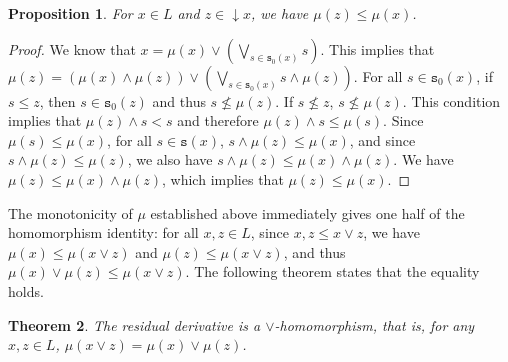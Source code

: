 \documentclass{article}
\newcommand{\comm}[2]{\begin{tcolorbox}[colback=gray!40]\textbf{Comment} (#1) : #2\end{tcolorbox}}
\newcommand{\blue}{\color{blue}}
\newtheorem{theorem}{Theorem}[section]
\newtheorem{proposition}[theorem]{Proposition}
\begin{document}
\begin{proposition}\label{proposition.increase.derivative}
    For $x \in L$ and $z \in \mathop{\downarrow}x$, we have $\mu(z) \le \mu(x)$. 
    \end{proposition}

\begin{proof}
     {We know that $x = \mu(x) \vee \left(\bigvee_{s \in \texttt{s}_0(x)} s\right)$.}
     This implies that 
    $\mu(z) = (\mu(x) \wedge \mu(z)) \vee \left(\bigvee_{s \in \texttt{s}_0(x)} s\wedge \mu(z)\right)$. For all $s \in \texttt{s}_0(x)$, {if $s \le z$, then $s \in \texttt{s}_0(z)$ and thus $s \not \le \mu(z)$. If $s \not \le z$, $s \not \le \mu(z)$. This condition implies that $\mu(z) \wedge s < s$ and therefore $\mu(z) \wedge s \le \mu(s)$. Since $\mu(s) \le \mu(x)$, for all $s \in \texttt{s}(x)$, $s \wedge \mu(z) \le \mu(x)$, and since $s \wedge \mu(z) \le \mu(z)$, we also have $s \wedge \mu(z) \le \mu(x) \wedge \mu(z)$. We have $\mu(z) \le \mu(x) \wedge \mu(z)$, which implies that $\mu(z) \le \mu(x)$.}
\end{proof}

{The monotonicity of \(\mu\) established above immediately gives one half of the homomorphism identity: for all $x,z \in L$, since \(x,z\leq x\vee z\), we have \(\mu(x)\leq\mu(x\vee z)\) and \(\mu(z)\leq\mu(x\vee z)\), and thus \(\mu(x)\vee\mu(z)\leq\mu(x\vee z)\). The following theorem states that the equality holds.}
\begin{theorem}
{The residual derivative is a \(\vee\)-homomorphism, that is,} for any $x,z \in L$, $\mu(x \vee z) = \mu(x) \vee \mu(z)$. 
\end{theorem}
\end{document}

